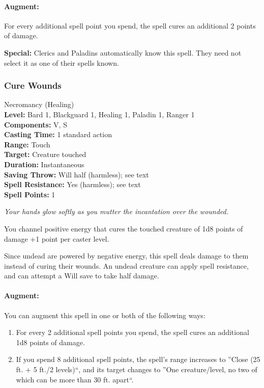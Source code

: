 \paragraph{Augment:} For every additional spell point you spend, the spell cures an additional 2 points of damage.

\textbf{Special:} Clerics and Paladins automatically know this spell. They need not select it as one of their spells known.
\subsubsection{Cure Wounds}
\label{Spell:CureWounds}
Necromancy (Healing)
\\ \textbf{Level:} Bard 1, Blackguard 1, Healing 1, Paladin 1, Ranger 1
\\ \textbf{Components:} V, S
\\ \textbf{Casting Time:} 1 standard action
\\ \textbf{Range:} Touch
\\ \textbf{Target:} Creature touched
\\ \textbf{Duration:} Instantaneous
\\ \textbf{Saving Throw:} Will half (harmless); see text
\\ \textbf{Spell Resistance:} Yes (harmless); see text
\\ \textbf{Spell Points:} 1

\emph{Your hands glow softly as you mutter the incantation over the wounded.}

You channel positive energy that cures the touched creature of 1d8 points of damage +1 point per caster level.

Since undead are powered by negative energy, this spell deals damage to them instead of curing their wounds. 
An undead creature can apply spell resistance, and can attempt a Will save to take half damage.

\paragraph{Augment:} You can augment this spell in one or both of the following ways:
\begin{enumerate}
 \item For every 2 additional spell points you spend, the spell cures an additional 1d8 points of damage.
 \item If you spend 8 additional spell points, the spell's range increases to ''Close (25 ft. + 5 ft./2 levels)``, 
and its target changes to ''One creature/level, no two of which can be more than 30 ft. apart``.
\end{enumerate}
